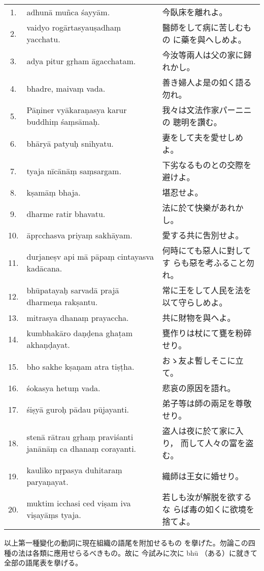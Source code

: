 \begin{longtable}{c*{2}{p{0.45\hsize}}}
 1. & adhunā muñca śayyām. & 今臥床を離れよ。\\
 2. & vaidyo rogārtasyauṣadhaṃ yacchatu. & 醫師をして病に苦しむもの
 に藥を與へしめよ。\\
 3. & adya pitur gṛham āgaccha\-tam. & 今汝等兩人は父の家に歸れかし。\\
 4. & bhadre, maivaṃ vada. & 善き婦人よ是の如く語る勿れ。\\
 5. & Pāṇiner vyākaraṇasya karur buddhiṃ śaṃsāmaḥ. & 我々は文法作家パーニニの
 聰明を讚む。\\
 6. & bhāryā patyuḥ snihyatu. & 妻をして夫を愛せしめよ。\\
 7. & tyaja nīcānāṃ saṃsargam. & 下劣なるものとの交際を避けよ。\\
 8. & kṣamāṃ bhaja. & 堪忍せよ。\\
 9. & dharme ratir bhavatu. & 法に於て快樂があれかし。\\
10. & āpṛcchasva priyaṃ sakhāyam. & 愛する共に吿別せよ。\\
11. & durjaneṣv api mā pāpaṃ cin\-tayasva kadācana. & 何時にても惡人に對してす
らも惡を考ふること勿れ。\\
12. & bhūpatayaḥ sarvadā prajā dharmeṇa rakṣantu. & 常に王をして人民を法を以て守らしめよ。\\
13. & mitrasya dhanaṃ prayaccha. & 共に財物を與へよ。\\
14. & kumbhakāro daṇḍena ghaṭam akhaṇḍayat. & 甕作りは杖にて甕を粉碎せり。\\
15. & bho sakhe kṣaṇam atra tiṣṭha. & おゝ友よ暫しそこに立て。\\
16. & śokasya hetuṃ vada. & 悲哀の原因を語れ。\\
17. & śiṣyā guroḥ pādau pūjayanti. & 弟子等は師の兩足を尊敬せり。\\
18. & stenā rātrau gṛhaṃ pravi\-śanti janānāṃ ca dhanaṃ cora\-yanti. & 盗人は夜に於て家に入り，
而して人々の富を盗む。\\
19. & kauliko nṛpasya duhitaraṃ paryaṇayat. & 織師は王女に婚せり。\\
20. & muktim icchasi ced viṣam iva viṣayāṃs tyaja. & 若しも汝が解脱を欲するな
らば毒の如くに欲境を捨てよ。
\end{longtable}

\numberParagraph
以上第一種變化の動詞に現在組織の語尾を附加せるもの
を擧げた。勿論この四種の法は各類に應用せらるべきもの。故に
今試みに次に bhū （ある）に就きて全部の語尾表を擧げる。


